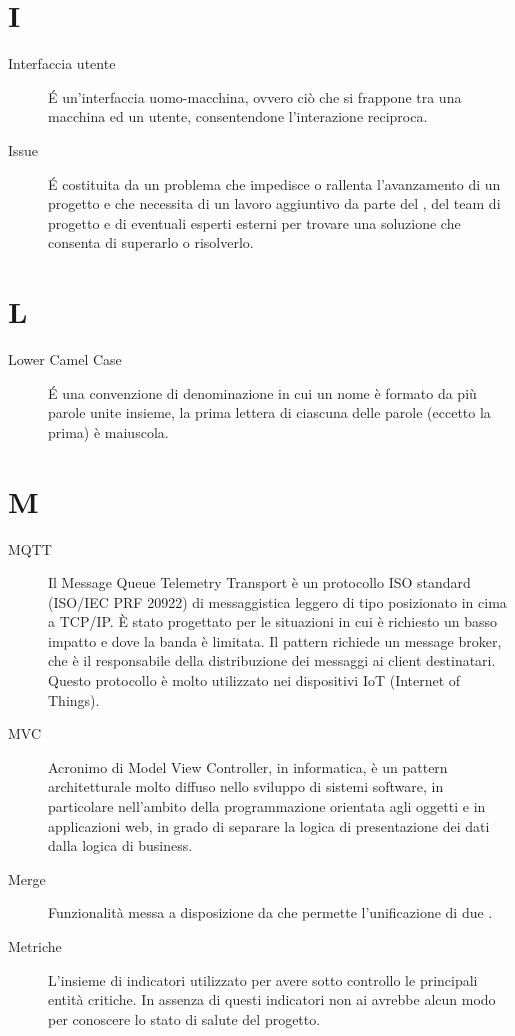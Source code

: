 \documentclass[a4paper, oneside]{article}
\begin{document}
\section{I}
\begin{description}
  \item[Interfaccia utente] É un'interfaccia uomo-macchina, ovvero ciò che si frappone tra una macchina ed un utente, consentendone l'interazione reciproca.
  \item[Issue] É costituita da un problema che impedisce o rallenta l'avanzamento di un progetto e che necessita di un lavoro aggiuntivo da parte del \RdP{}, del team di progetto e di eventuali esperti esterni per trovare una soluzione che consenta di superarlo o risolverlo.
\end{description}
\newpage
\section{L}
\begin{description}
  \item[Lower Camel Case] É una convenzione di denominazione in cui un nome è formato da più parole unite insieme, la prima lettera di ciascuna delle parole (eccetto la prima) è maiuscola.
\end{description}
\newpage
\section{M}
\begin{description}
  \item[MQTT] Il Message Queue Telemetry Transport è un protocollo ISO standard (ISO/IEC PRF 20922) di messaggistica leggero di tipo  posizionato in cima a TCP/IP. È stato progettato per le situazioni in cui è richiesto un basso impatto e dove la banda è limitata. Il pattern  richiede un message broker, che è il responsabile della distribuzione dei messaggi ai client destinatari. Questo protocollo è molto utilizzato nei dispositivi IoT (Internet of Things).
  \item[MVC] Acronimo di Model View Controller, in informatica, è un pattern architetturale molto diffuso nello sviluppo di sistemi software, in particolare nell'ambito della programmazione orientata agli oggetti e in applicazioni web, in grado di separare la logica di presentazione dei dati dalla logica di business.
  \item[Merge] Funzionalità messa a disposizione da  che permette l'unificazione di due .
  \item[Metriche] L’insieme di indicatori utilizzato per avere sotto controllo le principali entità critiche. In assenza di questi indicatori non ai avrebbe alcun modo per conoscere lo stato di salute del progetto.
\end{description}
\newpage
\end{document}
